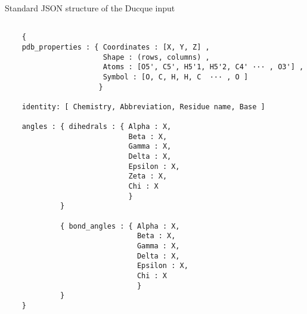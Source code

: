 \noindent Standard JSON structure of the Ducque input
\small
\begin{verbatim}

    { 
	pdb_properties : { Coordinates : [X, Y, Z] ,
                       Shape : (rows, columns) ,
                       Atoms : [O5', C5', H5'1, H5'2, C4' ··· , O3'] ,
                       Symbol : [O, C, H, H, C  ··· , O ] 
                      }

	identity: [ Chemistry, Abbreviation, Residue name, Base ]

	angles : { dihedrals : { Alpha : X,
                             Beta : X,
                             Gamma : X,
                             Delta : X,
                             Epsilon : X,
                             Zeta : X,
                             Chi : X
                             }
             }

             { bond_angles : { Alpha : X, 
                               Beta : X,
                               Gamma : X,
                               Delta : X,
                               Epsilon : X,
                               Chi : X
                               }
             }
    }
    
\end{verbatim}
\normalsize
